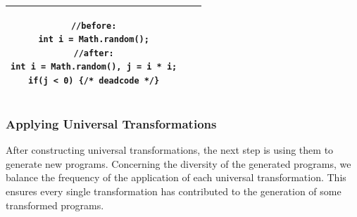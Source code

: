 \begin{table}
{\begin{tabular}{ c|c|c}
 \begin{minipage}[m]{0.5\textwidth}
\lstset{style=mystyle, frame=none} 
\begin{lstlisting}
//before:
int i = Math.random();
//after:
int i = Math.random(), j = i * i;
if(j < 0) {/* deadcode */}\end{lstlisting}
		\end{minipage} \\\hline
		\end{tabular}}
	\vspace*{-13pt}
\end{table}

\subsubsection{Applying Universal Transformations}
After constructing universal transformations, the next step is using them to generate new programs. Concerning the diversity of the generated programs, we balance the frequency of the application of each universal transformation. This ensures every single transformation has contributed to the generation of some transformed programs.






